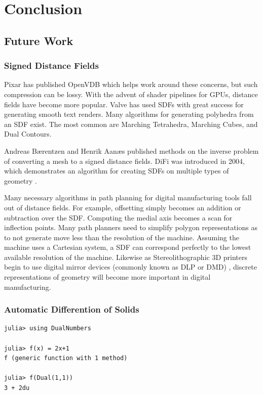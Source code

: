 \chapter{Conclusion}

\section{Future Work}

\subsection{Signed Distance Fields}

Pixar has published OpenVDB which helps
work around these concerns, but such compression can be lossy.\cite{OpenVDB}
With the advent of shader pipelines for GPUs, distance fields have become
more popular. Valve has used SDFs with great success for generating smooth
text renders. \cite{Green_2007}
Many algorithms for generating polyhedra from an SDF
exist. The most common are Marching Tetrahedra, Marching Cubes,
and Dual Contours.\cite{Muller_Wehle_1997}\cite{Newman_Yi_2006}\cite{Cook_Hourvitz}

Andreas Bærentzen and Henrik Aanæs published methods on the inverse
problem of converting a mesh to a signed distance fields.\cite{Baerentzen_Aanaes}
DiFi was introduced in 2004, which demonstrates an algorithm for creating
SDFs on multiple types of geometry \cite{Sud_Otaduy_Manocha_2004}.

Many necessary algorithms in path planning for digital manufacturing tools
fall out of distance fields. For example, offsetting simply becomes
an addition or subtraction over the SDF. Computing the medial axis becomes
a scan for inflection points. Many path planners need to simplify polygon
representations as to not generate move less than the resolution of the machine.
Assuming the machine uses a Cartesian system, a SDF can correspond perfectly
to the lowest available resolution of the machine.
Likewise as Stereolithographic 3D printers
begin to use digital mirror devices (commonly known as DLP or DMD)
, discrete representations of geometry will become more important in
digital manufacturing.

\subsection{Automatic Differention of Solids}

\begin{lstlisting}
julia> using DualNumbers

julia> f(x) = 2x+1
f (generic function with 1 method)

julia> f(Dual(1,1))
3 + 2du
\end{lstlisting}




